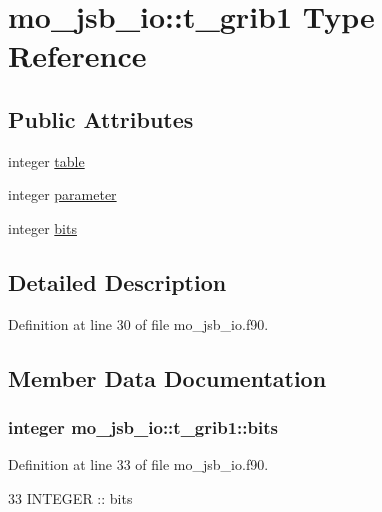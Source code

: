 \hypertarget{structmo__jsb__io_1_1t__grib1}{}\section{mo\+\_\+jsb\+\_\+io\+:\+:t\+\_\+grib1 Type Reference}
\label{structmo__jsb__io_1_1t__grib1}
\subsection*{Public Attributes}
\begin{DoxyCompactItemize}
\item 
integer \hyperlink{structmo__jsb__io_1_1t__grib1_a8a845bcc6a7706bff62b3f05c368754a}{table}
\item 
integer \hyperlink{structmo__jsb__io_1_1t__grib1_aa164650bd0115ed067cb2b0a78470309}{parameter}
\item 
integer \hyperlink{structmo__jsb__io_1_1t__grib1_a1767c8b8b08d77d282318cf553a75bd4}{bits}
\end{DoxyCompactItemize}


\subsection{Detailed Description}


Definition at line 30 of file mo\+\_\+jsb\+\_\+io.\+f90.



\subsection{Member Data Documentation}
\hypertarget{structmo__jsb__io_1_1t__grib1_a1767c8b8b08d77d282318cf553a75bd4}{}
\subsubsection[{bits}]{\setlength{\rightskip}{0pt plus 5cm}integer mo\+\_\+jsb\+\_\+io\+::t\+\_\+grib1\+::bits}\label{structmo__jsb__io_1_1t__grib1_a1767c8b8b08d77d282318cf553a75bd4}


Definition at line 33 of file mo\+\_\+jsb\+\_\+io.\+f90.


\begin{DoxyCode}
33     \textcolor{keywordtype}{INTEGER} :: bits
\end{DoxyCode}
\hypertarget{structmo__jsb__io_1_1t__grib1_aa164650bd0115ed067cb2b0a78470309}{}

